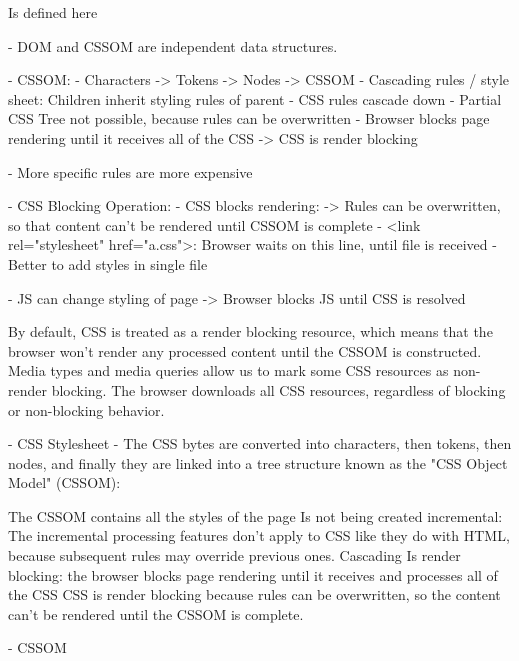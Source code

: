 Is defined here %



- DOM and CSSOM are independent data structures.

- CSSOM:
	- Characters -> Tokens -> Nodes -> CSSOM
	- Cascading rules / style sheet: Children inherit styling rules of parent
	- CSS rules cascade down
	- Partial CSS Tree not possible, because rules can be overwritten
	- Browser blocks page rendering until it receives all of the CSS
	-> CSS is render blocking

	- More specific rules are more expensive
	
	
- CSS Blocking Operation:
	- CSS blocks rendering:
	-> Rules can be overwritten, so that content can't be rendered until CSSOM is complete
	- <link rel="stylesheet" href="a.css">: Browser waits on this line, until file is received
	- Better to add styles in single file

	- JS can change styling of page -> Browser blocks JS until CSS is resolved
	
	
By default, CSS is treated as a render blocking resource, which means that the browser won't render any processed content until the CSSOM is constructed.
Media types and media queries allow us to mark some CSS resources as non-render blocking.
The browser downloads all CSS resources, regardless of blocking or non-blocking behavior.



- CSS Stylesheet
- The CSS bytes are converted into characters, then tokens, then nodes, and finally they are linked into a tree structure known as the "CSS Object Model" (CSSOM):


The CSSOM contains all the styles of the page
Is not being created incremental: The incremental processing features don't apply to CSS like they do with HTML, because subsequent rules may override previous ones. Cascading
Is render blocking: the browser blocks page rendering until it receives and processes all of the CSS
CSS is render blocking because rules can be overwritten, so the content can't be rendered until the CSSOM is complete.



- CSSOM



